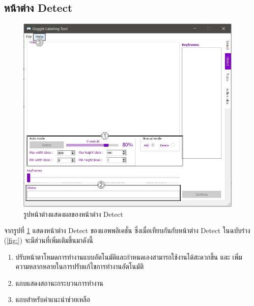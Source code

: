 \subsection*{หน้าต่าง Detect}
\begin{figure}[!ht]
  \centering
    \includegraphics[scale=0.4]{chapter4/images/Final_ui/Detect.jpg}
    \caption{รูปหน้าต่างแสดงผลของหน้าต่าง Detect}
    \label{fig:final_detect}
\end{figure}
จากรูปที่ \ref{fig:final_detect} แสดงหน้าต่าง Detect ของแอพพลิเคชั่น ซึ่งเมื่อเทียบกันกับหน้าต่าง Detect ในฉบับร่าง (\ref{fig:}) จะมีส่วนที่เพิ่มเติมขึ้นมาดังนี้
\begin{enumerate}
	\item ปรับหน้าตาโหมดการทำงานแบบอัตโนมัติและกำหนดเองสามารถใช้งานได้สะดวกขึ้น และ เพิ่มความหลากหลายในการปรับแก้ไขการทำงานอัตโนมัติ
	\item แถบแสดงสถานะกระบวนการทำงาน
	\item แถบสำหรับคำแนะนำช่วยเหลือ
\end{enumerate}		

\clearpage
